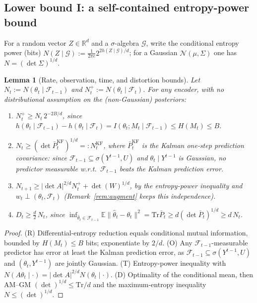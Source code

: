 \documentclass[11pt]{article}
\newtheorem{lemma}{Lemma}
\theoremstyle{definition}
\newcommand{\R}{\mathbb{R}}
\newcommand{\E}{\mathbb{E}}
\newcommand{\Tr}{\mathrm{Tr}}
\newcommand{\Ncal}{\mathcal{N}}
\begin{document}
\subsection{Lower bound I: a self-contained entropy-power bound}\label{app:seqrd:lb1}
For a random vector $Z\in\R^d$ and a $\sigma$-algebra $\mathcal G$, write the conditional entropy power
(bits) $N(Z\mid\mathcal G):=\tfrac{1}{2\pi e}2^{2h(Z\mid\mathcal G)/d}$; for a Gaussian $\Ncal(\mu,\Sigma)$
one has $N=(\det\Sigma)^{1/d}$.

\begin{lemma}[Rate, observation, time, and distortion bounds]
\label{lem:entropypower}
Let $N_t:=N(\theta_t\mid\mathcal F_{t-1})$ and $N_t^+:=N(\theta_t\mid\mathcal F_t)$. For any encoder, with
no distributional assumption on the (non-Gaussian) posteriors:
\begin{enumerate}[leftmargin=2em,itemsep=1pt]
\item[(R)] $N_t^+\ge N_t\,2^{-2B/d}$, since
$h(\theta_t\mid\mathcal F_{t-1})-h(\theta_t\mid\mathcal F_t)=I(\theta_t;M_t\mid\mathcal F_{t-1})\le H(M_t)\le B$.
\item[(O)] $N_t\ge(\det \bar P^{\mathrm{KF}}_t)^{1/d}=:N^{\mathrm{KF}}_t$, where $\bar P^{\mathrm{KF}}_t$
is the Kalman one-step prediction covariance: since $\mathcal F_{t-1}\subseteq\sigma(Y^{t-1},U)$ and
$\theta_t\mid Y^{t-1}$ is Gaussian, no predictor measurable w.r.t.\ $\mathcal F_{t-1}$ beats the Kalman
prediction error.
\item[(T)] $N_{t+1}\ge|\det A|^{2/d}N_t^+ + \det(W)^{1/d}$, by the entropy-power inequality and
$w_t\perp(\theta_t,\mathcal F_t)$ (Remark~\ref{rem:augment} keeps this independence).
\item[(D)] $D_t\ge\tfrac d2\,N_t$, since $\inf_{\hat\theta_t\in\mathcal F_{t-1}}\E\|\hat\theta_t-\theta_t\|^2=\Tr\bar P_t\ge d(\det\bar P_t)^{1/d}\ge d\,N_t$.
\end{enumerate}
\end{lemma}
\begin{proof}
(R) Differential-entropy reduction equals conditional mutual information, bounded by $H(M_t)\le B$ bits;
exponentiate by $2/d$. (O) Any $\mathcal F_{t-1}$-measurable predictor has error at least the Kalman
prediction error, as $\mathcal F_{t-1}\subseteq\sigma(Y^{t-1},U)$ and $(\theta_t,Y^{t-1})$ are jointly
Gaussian. (T) Entropy-power inequality \citep[Thm.~17.7.3]{cover2006elements} with $N(A\theta_t\mid\cdot)=|\det A|^{2/d}N(\theta_t\mid\cdot)$.
(D) Optimality of the conditional mean, then AM--GM $(\det)^{1/d}\le\Tr/d$ and the maximum-entropy
inequality $N\le(\det)^{1/d}$.
\end{proof}
\end{document}
